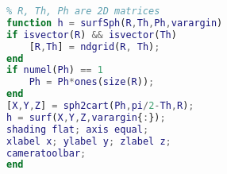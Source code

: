 
\begin{lstlisting}[language=matlab]
% surf() in spherical coordinate
% R, Th, Ph are 2D matrices
function h = surfSph(R,Th,Ph,varargin)
if isvector(R) && isvector(Th)
    [R,Th] = ndgrid(R, Th);
end
if numel(Ph) == 1
    Ph = Ph*ones(size(R));
end
[X,Y,Z] = sph2cart(Ph,pi/2-Th,R);
h = surf(X,Y,Z,varargin{:});
shading flat; axis equal;
xlabel x; ylabel y; zlabel z;
cameratoolbar;
end
\end{lstlisting}
